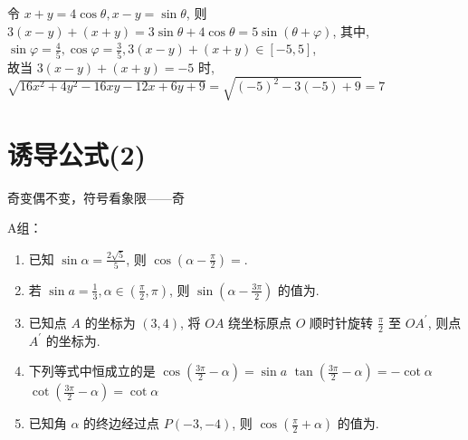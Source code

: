 \begin{enumerate}
\begin{jieda}
令 $x+y=4 \cos \theta, x-y=\sin \theta$,
则 $3\left(x-y\right)+\left(x+y\right)=3 \sin \theta+4 \cos \theta=5 \sin \left(\theta+\varphi\right)$,
其中, $\sin \varphi=\frac{4}{5}, \cos \varphi=\frac{3}{5}, 3\left(x-y\right)+\left(x+y\right) \in[-5,5]$,\\
故当 $3\left(x-y\right)+\left(x+y\right)=-5$ 时,
$\sqrt{16 x^2+4 y^2-16 x y-12 x+6 y+9}=\sqrt{\left(-5\right)^2-3\left(-5\right)+9} =7$

    \end{jieda}
    
\end{enumerate}

\section{诱导公式(2)}
\zsd 奇变偶不变，符号看象限——奇

A组：
\begin{enumerate}
\item 已知 $\sin \alpha=\frac{2 \sqrt{5}}{5}$, 则 $\cos \left(\alpha-\frac{\pi}{2}\right)=$.

\item 若 $\sin a=\frac{1}{3}, \alpha\in\left(\frac{\pi}{2}, \pi\right)$, 则 $\sin \left(\alpha-\frac{3 \pi}{2}\right)$ 的值为.

\item 已知点 $A$ 的坐标为 $\left(3,4\right)$, 将 $O A$ 绕坐标原点 $O$ 顺时针旋转 $\frac{\pi}{2}$ 至 $O A^{\prime}$, 则点 $A^{\prime}$ 的坐标为.
\item 下列等式中恒成立的是
{$\cos \left(\frac{3 \pi}{2}-\alpha\right)=\sin a$}
{$\tan \left(\frac{3 \pi}{2}-\alpha\right)=-\cot \alpha$}
{$\cot \left(\frac{3 \pi}{2}-\alpha\right)=\cot \alpha$}


\item 已知角 $\alpha$ 的终边经过点 $P\left(-3,-4\right)$, 则 $\cos \left(\frac{\pi}{2}+\alpha\right)$ 的值为.


\end{enumerate}

